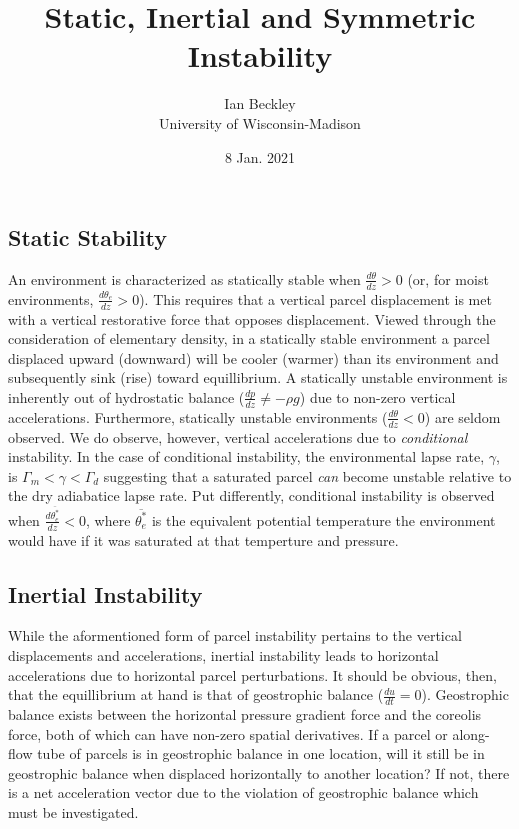\documentclass[a4paper,12pt]{article}
\begin{document}
\title{\vspace{-4.0cm} Static, Inertial and Symmetric Instability}
\author{Ian Beckley
\\University of Wisconsin-Madison}

\date{8 Jan. 2021}

\maketitle

\subsection*{Static Stability}

An environment is characterized as statically stable when $\frac{d\theta}{dz} > 0$ (or, for moist environments, $\frac{d\theta_e}{dz} > 0$). This requires that a vertical parcel displacement is met with a vertical restorative force that opposes displacement. Viewed through the consideration of elementary density, in a statically stable environment a parcel displaced upward (downward) will be cooler (warmer) than its environment and subsequently sink (rise) toward equillibrium. A statically unstable environment is inherently out of hydrostatic balance ($\frac{dp}{dz} \neq -\rho g$) due to non-zero vertical accelerations. Furthermore, statically unstable environments ($\frac{d\theta}{dz} < 0$) are seldom observed. We do observe, however, vertical accelerations due to \emph{conditional} instability. In the case of conditional instability, the environmental lapse rate, $\gamma$, is $\Gamma_m < \gamma < \Gamma_d$ suggesting that a saturated parcel  \emph{can} become unstable relative to the dry adiabatice lapse rate. Put differently, conditional instability is observed when $\frac{d\overline{\theta_e^*}}{dz} < 0$, where $\overline{\theta_e^*}$ is the equivalent potential temperature the environment would have if it was saturated at that temperture and pressure.

\subsection*{Inertial Instability}
While the aformentioned form of parcel instability pertains to the vertical displacements and accelerations, inertial instability leads to horizontal accelerations due to horizontal parcel perturbations. It should be obvious, then, that the equillibrium at hand is that of geostrophic balance ($\frac{du}{dt} = 0$). Geostrophic balance exists between the horizontal pressure gradient force and the coreolis force, both of which can have non-zero spatial derivatives. If a parcel or along-flow tube of parcels is in geostrophic balance in one location, will it still be in geostrophic balance when displaced horizontally to another location? If not, there is a net acceleration vector due to the violation of geostrophic balance which must be investigated. 
\end{document}

